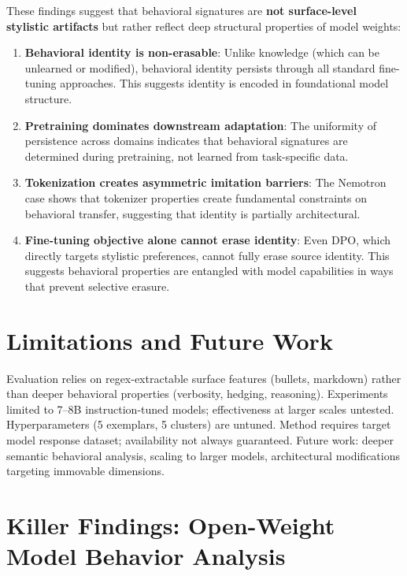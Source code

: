 \documentclass{article}
\begin{document}
These findings suggest that behavioral signatures are \textbf{not surface-level stylistic artifacts} but rather reflect deep structural properties of model weights:

\begin{enumerate}
\item \textbf{Behavioral identity is non-erasable}: Unlike knowledge (which can be unlearned or modified), behavioral identity persists through all standard fine-tuning approaches. This suggests identity is encoded in foundational model structure.

\item \textbf{Pretraining dominates downstream adaptation}: The uniformity of persistence across domains indicates that behavioral signatures are determined during pretraining, not learned from task-specific data.

\item \textbf{Tokenization creates asymmetric imitation barriers}: The Nemotron case shows that tokenizer properties create fundamental constraints on behavioral transfer, suggesting that identity is partially architectural.

\item \textbf{Fine-tuning objective alone cannot erase identity}: Even DPO, which directly targets stylistic preferences, cannot fully erase source identity. This suggests behavioral properties are entangled with model capabilities in ways that prevent selective erasure.
\end{enumerate}

\section{Limitations and Future Work}

Evaluation relies on regex-extractable surface features (bullets, markdown) rather than deeper behavioral properties (verbosity, hedging, reasoning). Experiments limited to 7--8B instruction-tuned models; effectiveness at larger scales untested. Hyperparameters (5 exemplars, 5 clusters) are untuned. Method requires target model response dataset; availability not always guaranteed. Future work: deeper semantic behavioral analysis, scaling to larger models, architectural modifications targeting immovable dimensions.

\section{Killer Findings: Open-Weight Model Behavior Analysis}
\label{sec:killer_findings}
\end{document}
